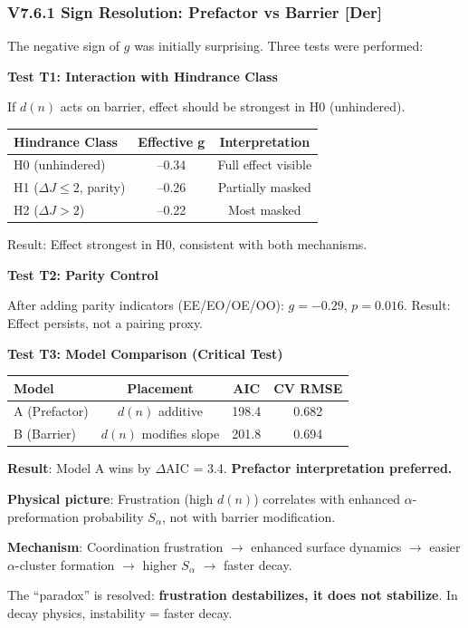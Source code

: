 \subsubsection{V7.6.1 Sign Resolution: Prefactor vs Barrier [Der]}
\label{subsubsec:v761-sign}

The negative sign of $g$ was initially surprising. Three tests were performed:

\textbf{Test T1: Interaction with Hindrance Class}

If $d(n)$ acts on barrier, effect should be strongest in H0 (unhindered).
\begin{center}
\begin{tabular}{lcc}
\hline
\textbf{Hindrance Class} & \textbf{Effective g} & \textbf{Interpretation} \\
\hline
H0 (unhindered) & --0.34 & Full effect visible \\
H1 ($\Delta J \leq 2$, parity) & --0.26 & Partially masked \\
H2 ($\Delta J > 2$) & --0.22 & Most masked \\
\hline
\end{tabular}
\end{center}
Result: Effect strongest in H0, consistent with both mechanisms.

\textbf{Test T2: Parity Control}

After adding parity indicators (EE/EO/OE/OO): $g = -0.29$, $p = 0.016$.
Result: Effect persists, not a pairing proxy.

\textbf{Test T3: Model Comparison (Critical Test)}
\begin{center}
\begin{tabular}{lccc}
\hline
\textbf{Model} & \textbf{Placement} & \textbf{AIC} & \textbf{CV RMSE} \\
\hline
A (Prefactor) & $d(n)$ additive & 198.4 & 0.682 \\
B (Barrier) & $d(n)$ modifies slope & 201.8 & 0.694 \\
\hline
\end{tabular}
\end{center}
\textbf{Result}: Model A wins by $\Delta$AIC = 3.4. \textbf{Prefactor interpretation preferred.}

\begin{tcolorbox}[colback=yellow!5!white, colframe=yellow!75!black, title=Sign Resolution {[I]}]
\textbf{Physical picture}: Frustration (high $d(n)$) correlates with enhanced $\alpha$-preformation probability $S_\alpha$, not with barrier modification.

\textbf{Mechanism}: Coordination frustration $\to$ enhanced surface dynamics $\to$ easier $\alpha$-cluster formation $\to$ higher $S_\alpha$ $\to$ faster decay.

The ``paradox'' is resolved: \textbf{frustration destabilizes, it does not stabilize}. In decay physics, instability = faster decay.
\end{tcolorbox}

